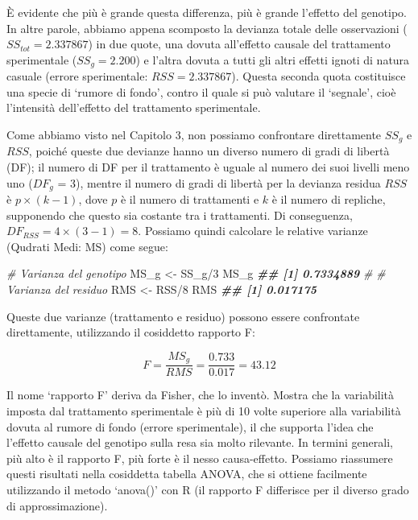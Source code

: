 \documentclass[
  12pt,
]{book}
\newenvironment{Shaded}{\begin{snugshade}}{\end{snugshade}}
\newcommand{\CommentTok}[1]{\textcolor[rgb]{0.56,0.35,0.01}{\textit{#1}}}
\newcommand{\DecValTok}[1]{\textcolor[rgb]{0.00,0.00,0.81}{#1}}
\newcommand{\DocumentationTok}[1]{\textcolor[rgb]{0.56,0.35,0.01}{\textbf{\textit{#1}}}}
\newcommand{\NormalTok}[1]{#1}
\newcommand{\OtherTok}[1]{\textcolor[rgb]{0.56,0.35,0.01}{#1}}
\newcommand{\SpecialCharTok}[1]{\textcolor[rgb]{0.00,0.00,0.00}{#1}}
\begin{document}
È evidente che più è grande questa differenza, più è grande l'effetto del genotipo. In altre parole, abbiamo appena scomposto la devianza totale delle osservazioni (\(SS_{tot} = 2.337867\)) in due quote, una dovuta all'effetto causale del trattamento sperimentale (\(SS_g = 2.200\)) e l'altra dovuta a tutti gli altri effetti ignoti di natura casuale (errore sperimentale: \(RSS = 2.337867\)). Questa seconda quota costituisce una specie di `rumore di fondo', contro il quale si può valutare il `segnale', cioè l'intensità dell'effetto del trattamento sperimentale.

Come abbiamo visto nel Capitolo 3, non possiamo confrontare direttamente \(SS_g\) e \(RSS\), poiché queste due devianze hanno un diverso numero di gradi di libertà (DF); il numero di DF per il trattamento è uguale al numero dei suoi livelli meno uno (\(DF_g\) = 3), mentre il numero di gradi di libertà per la devianza residua \(RSS\) è \(p \times (k -1)\), dove \(p\) è il numero di trattamenti e \(k\) è il numero di repliche, supponendo che questo sia costante tra i trattamenti. Di conseguenza, \(DF_{RSS} = 4 \times (3 - 1) = 8\). Possiamo quindi calcolare le relative varianze (Qudrati Medi: MS) come segue:

\vspace{12pt}

\begin{Shaded}
\begin{Highlighting}[]
\CommentTok{\# Varianza del genotipo}
\NormalTok{MS\_g }\OtherTok{\textless{}{-}}\NormalTok{ SS\_g}\SpecialCharTok{/}\DecValTok{3}
\NormalTok{MS\_g}
\DocumentationTok{\#\# [1] 0.7334889}
\CommentTok{\#}
\CommentTok{\# Varianza del residuo}
\NormalTok{RMS }\OtherTok{\textless{}{-}}\NormalTok{ RSS}\SpecialCharTok{/}\DecValTok{8}
\NormalTok{RMS}
\DocumentationTok{\#\# [1] 0.017175}
\end{Highlighting}
\end{Shaded}

Queste due varianze (trattamento e residuo) possono essere confrontate direttamente, utilizzando il cosiddetto rapporto F:

\[F = \frac{MS_g}{RMS} = \frac{0.733}{0.017} = 43.12\]

Il nome `rapporto F' deriva da Fisher, che lo inventò. Mostra che la variabilità imposta dal trattamento sperimentale è più di 10 volte superiore alla variabilità dovuta al rumore di fondo (errore sperimentale), il che supporta l'idea che l'effetto causale del genotipo sulla resa sia molto rilevante. In termini generali, più alto è il rapporto F, più forte è il nesso causa-effetto. Possiamo riassumere questi risultati nella cosiddetta tabella ANOVA, che si ottiene facilmente utilizzando il metodo `anova()' con R (il rapporto F differisce per il diverso grado di approssimazione).
\end{document}
